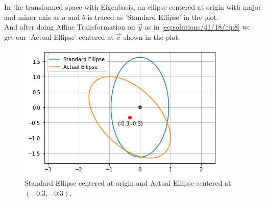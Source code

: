 In the transformed space with Eigenbasis, an ellipse centered at origin with major and minor axis as $a$ and $b$ is traced as 'Standard Ellipse' in the plot.\\


And after doing Affine Transformation on $\vec{y}$ as in \eqref{eq:solutions/41/18/eq:8} we get our 'Actual Ellipse' centered at $\vec{c}$ shown in the plot.
\begin{figure}[h]
\centering
    \includegraphics[width=\columnwidth]{solutions/41/18/ellipse.png}
    \caption{Standard Ellipse centered at origin and Actual Ellipse centered at $(-0.3,-0.3)$.}
    \label{eq:solutions/41/18/tangent}
\end{figure}
